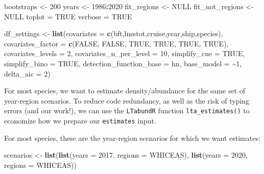 \documentclass[
]{book}
\newenvironment{Shaded}{\begin{snugshade}}{\end{snugshade}}
\newcommand{\AttributeTok}[1]{\textcolor[rgb]{0.13,0.29,0.53}{#1}}
\newcommand{\ConstantTok}[1]{\textcolor[rgb]{0.56,0.35,0.01}{#1}}
\newcommand{\DecValTok}[1]{\textcolor[rgb]{0.00,0.00,0.81}{#1}}
\newcommand{\FunctionTok}[1]{\textcolor[rgb]{0.13,0.29,0.53}{\textbf{#1}}}
\newcommand{\NormalTok}[1]{#1}
\newcommand{\OtherTok}[1]{\textcolor[rgb]{0.56,0.35,0.01}{#1}}
\newcommand{\SpecialCharTok}[1]{\textcolor[rgb]{0.81,0.36,0.00}{\textbf{#1}}}
\newcommand{\StringTok}[1]{\textcolor[rgb]{0.31,0.60,0.02}{#1}}
\begin{document}
\begin{Shaded}
\begin{Highlighting}[]
\NormalTok{bootstraps }\OtherTok{\textless{}{-}} \DecValTok{200}
\NormalTok{years }\OtherTok{\textless{}{-}} \DecValTok{1986}\SpecialCharTok{:}\DecValTok{2020}
\NormalTok{fit\_regions }\OtherTok{\textless{}{-}} \ConstantTok{NULL}
\NormalTok{fit\_not\_regions }\OtherTok{\textless{}{-}} \ConstantTok{NULL}
\NormalTok{toplot }\OtherTok{=} \ConstantTok{TRUE}
\NormalTok{verbose }\OtherTok{=} \ConstantTok{TRUE}

\NormalTok{df\_settings }\OtherTok{\textless{}{-}}
  \FunctionTok{list}\NormalTok{(}\AttributeTok{covariates =} \FunctionTok{c}\NormalTok{(}\StringTok{\textquotesingle{}bft\textquotesingle{}}\NormalTok{,}\StringTok{\textquotesingle{}lnsstot\textquotesingle{}}\NormalTok{,}\StringTok{\textquotesingle{}cruise\textquotesingle{}}\NormalTok{,}\StringTok{\textquotesingle{}year\textquotesingle{}}\NormalTok{,}\StringTok{\textquotesingle{}ship\textquotesingle{}}\NormalTok{,}\StringTok{\textquotesingle{}species\textquotesingle{}}\NormalTok{),}
       \AttributeTok{covariates\_factor =} \FunctionTok{c}\NormalTok{(}\ConstantTok{FALSE}\NormalTok{, }\ConstantTok{FALSE}\NormalTok{, }\ConstantTok{TRUE}\NormalTok{, }\ConstantTok{TRUE}\NormalTok{, }\ConstantTok{TRUE}\NormalTok{, }\ConstantTok{TRUE}\NormalTok{),}
       \AttributeTok{covariates\_levels =} \DecValTok{2}\NormalTok{,}
       \AttributeTok{covariates\_n\_per\_level =} \DecValTok{10}\NormalTok{,}
       \AttributeTok{simplify\_cue =} \ConstantTok{TRUE}\NormalTok{,}
       \AttributeTok{simplify\_bino =} \ConstantTok{TRUE}\NormalTok{,}
       \AttributeTok{detection\_function\_base =} \StringTok{\textquotesingle{}hn\textquotesingle{}}\NormalTok{,}
       \AttributeTok{base\_model =} \StringTok{\textquotesingle{}\textasciitilde{}1\textquotesingle{}}\NormalTok{,}
       \AttributeTok{delta\_aic =} \DecValTok{2}\NormalTok{)}
\end{Highlighting}
\end{Shaded}

For most species, we want to estimate density/abundance for the same set of year-region scenarios. To reduce code redundancy, as well as the risk of typing errors (and our work!), we can use the \texttt{LTabundR} function \texttt{lta\_estimates()} to economize how we prepare our \texttt{estimates} input.

For most species, these are the year-region scenarios for which we want estimates:

\begin{Shaded}
\begin{Highlighting}[]
\NormalTok{scenarios }\OtherTok{\textless{}{-}} \FunctionTok{list}\NormalTok{(}\FunctionTok{list}\NormalTok{(}\AttributeTok{years =} \DecValTok{2017}\NormalTok{,}
                       \AttributeTok{regions =} \StringTok{\textquotesingle{}WHICEAS\textquotesingle{}}\NormalTok{),}
                  \FunctionTok{list}\NormalTok{(}\AttributeTok{years =} \DecValTok{2020}\NormalTok{, }
                       \AttributeTok{regions =} \StringTok{\textquotesingle{}WHICEAS\textquotesingle{}}\NormalTok{))}
\end{Highlighting}
\end{Shaded}
\end{document}
